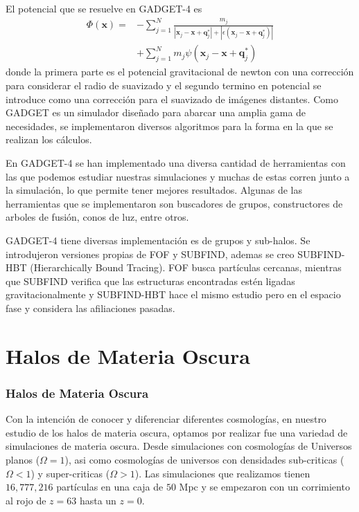 \documentclass{beamer}
\begin{document}
	
	\begin{frame}
		El potencial que se resuelve en GADGET-4 es 
		\begin{align}
    \Phi (\textbf{x}) = &- \sum_{j=1}^{N} \frac{m_j}{|\textbf{x}_j-\textbf{x}+\textbf{q}^*_j| + |\epsilon(\textbf{x}_j-\textbf{x}+\textbf{q}^*_j)|} \nonumber \\
    &+ \sum_{j=1}^{N} m_j \psi (\textbf{x}_j-\textbf{x}+\textbf{q}^*_j) \label{eq:Pot}
\end{align}
		donde la primera parte es el potencial gravitacional de newton con una corrección para considerar el radio de suavizado y el segundo termino en potencial se introduce como una corrección para el suavizado de imágenes distantes. Como GADGET es un simulador diseñado para abarcar una amplia gama de necesidades, se implementaron diversos algoritmos para la forma en la que se realizan los cálculos.
	\end{frame}
	
	\begin{frame}
		En GADGET-4 se han implementado una diversa cantidad de herramientas con las que podemos estudiar nuestras simulaciones y muchas de estas corren junto a la simulación, lo que permite tener mejores resultados. Algunas de las herramientas que se implementaron son buscadores de grupos, constructores de arboles de fusión, conos de luz, entre otros.
	\end{frame}
	
	\begin{frame}
		GADGET-4 tiene diversas implementación es de grupos y sub-halos. Se introdujeron versiones propias de FOF y SUBFIND, ademas se creo SUBFIND-HBT (Hierarchically Bound Tracing). FOF busca partículas cercanas, mientras que SUBFIND verifica que las estructuras encontradas estén ligadas gravitacionalmente y SUBFIND-HBT hace el mismo estudio pero en el espacio fase y considera las afiliaciones pasadas.
	
	\end{frame}


\section{Halos de Materia Oscura}
\setcounter{equation}{0}
	\begin{frame}
		\frametitle{Halos de Materia Oscura}
		Con la intención de conocer y diferenciar diferentes cosmologías, en nuestro estudio de los halos de materia oscura, optamos por realizar fue una variedad de simulaciones de materia oscura. Desde simulaciones con cosmologías de Universos planos ($\Omega=1$), asi como cosmologías de universos con densidades sub-criticas ($\Omega < 1$) y super-criticas ($\Omega > 1$). Las simulaciones que realizamos tienen $16,777,216$ partículas en una caja de $50$ Mpc y se empezaron con un corrimiento al rojo de $z = 63$ hasta un $z = 0$.
		
	\end{frame}
\end{document}
